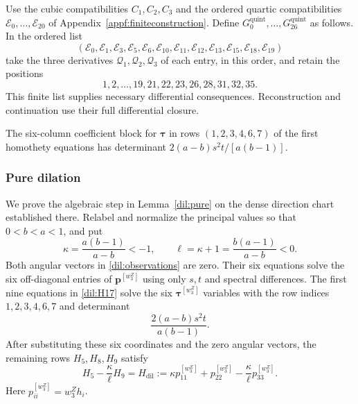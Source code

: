 \documentclass[11pt,a4paper]{article}
\numberwithin{equation}{section}
\theoremstyle{plain}
\theoremstyle{definition}
\theoremstyle{remark}
\begin{document}
Use the cubic compatibilities $C_1,C_2,C_3$ and the ordered quartic
compatibilities $\mathcal E_0,\ldots,\mathcal E_{20}$ of
Appendix~\ref{appf:finiteconstruction}. Define $G_0^{\mathrm{quint}},\ldots,G_{26}^{\mathrm{quint}}$ as follows. In the
ordered list
\[
 (\mathcal E_0,\mathcal E_1,\mathcal E_3,\mathcal E_5,\mathcal E_6,\mathcal E_{10},\mathcal E_{11},\mathcal E_{12},\mathcal E_{13},\mathcal E_{15},\mathcal E_{18},\mathcal E_{19})
\]
take the three derivatives $\mathcal Q_1,\mathcal Q_2,\mathcal Q_3$ of each entry, in this order,
and retain the positions
\begin{equation}\label{dil:G-order}
 1,2,\ldots,19,21,22,23,26,28,31,32,35.
\end{equation}
This finite list supplies necessary differential consequences.
Reconstruction and continuation use their full differential closure.

 The six-column coefficient block for $\boldsymbol\tau$ in rows
$(1,2,3,4,6,7)$ of the first homothety equations has determinant
$2(a-b)s^2t/[a(b-1)]$.

\subsubsection{Pure dilation}\label{adil:pure-dilation}
We prove the algebraic step in Lemma~\ref{dil:pure} on the dense
direction chart established there.
Relabel and normalize the principal values so that $0<b<a<1$, and put
\[
 \kappa=\frac{a(b-1)}{a-b}<-1,\qquad
 \ell=\kappa+1=\frac{b(a-1)}{a-b}<0.
\]
Both angular vectors in \eqref{dil:observations} are zero.  Their
six equations solve the six off-diagonal entries of $\boldsymbol p^{[w_3^Z]}$ using only
$s,t$ and spectral differences.  The first nine equations in
\eqref{dil:H17} solve the six $\boldsymbol\tau^{[w_3^Z]}$ variables with the row indices
$1,2,3,4,6,7$ and determinant
\[
                    \frac{2(a-b)s^2t}{a(b-1)}.
\]
After substituting these six coordinates and the zero angular vectors,
the remaining rows $H_5,H_8,H_9$ satisfy
\begin{equation}\label{dil:pure-T}
 H_5-\frac\kappa\ell H_9
       =H_{\mathrm{dil}}:=\kappa p_{11}^{[w_3^Z]}+p_{22}^{[w_3^Z]}-\frac\kappa\ell p_{33}^{[w_3^Z]}.
\end{equation}
Here $p_{ii}^{[w_3^Z]}=w_3^Zh_i$.
\end{document}
